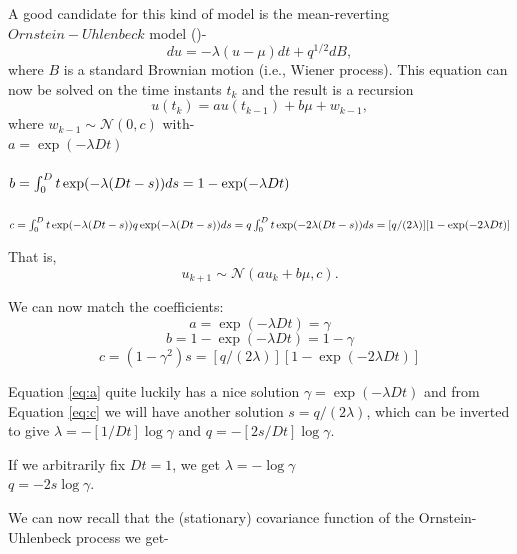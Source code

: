 A good candidate for this kind of model is the mean-reverting $Ornstein-Uhlenbeck$ model 
(\cite{Ornstein_Uhlenbeck:1930})-
\begin{equation}
du = -\lambda \left(u - \mu\right) dt + q^{1/2} dB,
\end{equation}
where $B$ is a standard Brownian motion (i.e., Wiener process). 
This equation can now be solved on the time instants $t_k$ and the result is a recursion
\begin{equation}
u(t_k) = a u(t_{k-1}) + b \mu + w_{k-1},
\end{equation}
where $w_{k-1} \sim \mathcal{N}(0,c)$ with-\\
$a = \exp(-\lambda Dt)$\\~\\
$b = \int_0^Dt \exp(-\lambda (Dt-s)) ds\\
 = 1 - \exp(-\lambda Dt)$\\~\\
$c = \int_0^Dt \exp(-\lambda (Dt-s)) q \exp(-\lambda (Dt-s)) ds \\
= q \int_0^Dt \exp(-2 \lambda (Dt-s)) ds\\
= [q / (2 \lambda)] [1 - \exp(-2 \lambda Dt)]$

That is,
\begin{equation}
u_{k+1} \sim \mathcal{N}\left(a u_k + b \mu, c\right).
\end{equation}

We can now match the coefficients:
\begin{equation} \label{eq:a}
a = \exp(-\lambda Dt) = \gamma
\end{equation}
\begin{equation} \label{eq:b}
b = 1 - \exp(-\lambda Dt) = 1 - \gamma
\end{equation}
\begin{equation} \label{eq:c}
c = (1 - \gamma^2) s = [q / (2 \lambda)] [1 - \exp(-2 \lambda Dt)]
\end{equation}

Equation \ref{eq:a} quite luckily has a nice solution 
$\gamma = \exp(-\lambda Dt)$ and from Equation \ref{eq:c} we will have another solution
$s = q / (2 \lambda)$,
which can be inverted to give
$\lambda = -[1 / Dt] \log \gamma$ and
$q = -[2 s / Dt] \log \gamma$. 

If we arbitrarily fix $Dt = 1$, we get
$\lambda = -\log \gamma$\\
$q = -2 s \log \gamma$.

We can now recall that the (stationary) covariance function of the Ornstein-Uhlenbeck process we get-

